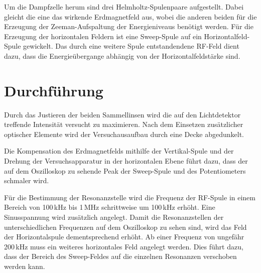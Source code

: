 \noindent Um die Dampfzelle herum sind drei Helmholtz-Spulenpaare aufgestellt. Dabei gleicht die eine das wirkende
Erdmagnetfeld aus, wobei die anderen beiden für die Erzeugung der Zeeman-Aufspaltung der
Energieniveaus benötigt werden. Für die Erzeugung der horizontalen Feldern ist eine Sweep-Spule auf ein Horizontalfeld-Spule
gewickelt. \newline
Das durch eine weitere Spule entstandendene RF-Feld dient dazu, dass die Energieübergange abhängig von
der Horizontalfeldstärke sind.

\section{Durchführung}
Durch das Justieren der beiden Sammellinsen wird die auf den Lichtdetektor
treffende Intensität versucht zu maximieren. Nach dem Einsetzen zusätzlicher optischer Elemente wird
der Versuchausaufbau durch eine Decke abgedunkelt.

Die Kompensation des Erdmagnetfelds mithilfe der Vertikal-Spule und der Drehung der Versuchsapparatur in der
horizontalen Ebene führt dazu, dass der auf dem Oszilloskop zu sehende Peak der Sweep-Spule und des Potentiometers
schmaler wird.

Für die Bestimmung der Resonanzstelle wird die Frequenz der RF-Spule in einem Bereich von 100\,kHz bis
1\,MHz schrittweise um 100\,kHz erhöht. Eine Sinusspannung wird zusätzlich angelegt.
Damit die Resonanzstellen der unterschiedlichen Frequenzen auf dem Oszilloskop zu sehen sind, wird
das Feld der Horizontalspule dementsprechend erhöht.
Ab einer Frequenz von ungefähr 200\,kHz muss ein weiteres horizontales Feld angelegt werden. Dies führt dazu,
dass der Bereich des Sweep-Feldes auf die einzelnen Resonanzen verschoben werden kann.
